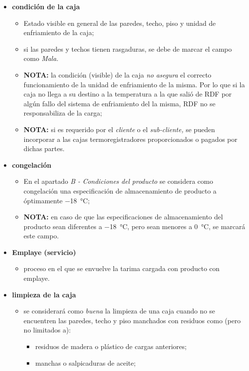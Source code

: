 \begin{itemize}
\begin{itemize}
	\end{itemize}
	\item \textbf{condición de la caja}
	\begin{itemize}
		\item Estado visible en general de las paredes, techo, piso y unidad de enfriamiento de la caja;
		\item si las paredes y techos tienen rasgaduras, se debe de marcar el campo como \emph{Mala.}
		\item \textbf{NOTA:} la condición (visible) de la caja \emph{no asegura} el correcto funcionamiento de la unidad de enfriamiento de la misma. Por lo que si la caja no llega a su destino a la temperatura a la que salió de RDF por algún fallo del sistema de enfriamiento del la misma, RDF no se responsabiliza de la carga;
		\item \textbf{NOTA:} si es requerido por el \emph{cliente} o el \emph{sub-cliente,} se pueden incorporar a las cajas termoregistradores proporcionados o pagados por dichas partes.
	\end{itemize}
	\item \textbf{congelación}
	\begin{itemize}
		\item En el apartado \emph{B - Condiciones del producto} se considera como congelación una especificación de almacenamiento de producto a óptimamente \SI{-18}{\celsius};
		\item \textbf{NOTA:} en caso de que las especificaciones de almacenamiento del producto sean diferentes a \SI{-18}{\celsius}, pero sean menores a \SI{0}{\celsius}, se marcará este campo.
	\end{itemize}
	\item \textbf{Emplaye (servicio)}
	\begin{itemize}
		\item proceso en el que se envuelve la tarima cargada con producto con emplaye.
	\end{itemize}
	\item \textbf{limpieza de la caja}
	\begin{itemize}
		\item se considerará como \emph{buena} la limpieza de una caja cuando no se encuentren las paredes, techo y piso manchados con residuos como (pero no limitados a):
		\begin{itemize}
			\item residuos de madera o plástico de cargas anteriores;
			\item manchas o salpicaduras de aceite;

\end{itemize}
\end{itemize}
\end{itemize}
